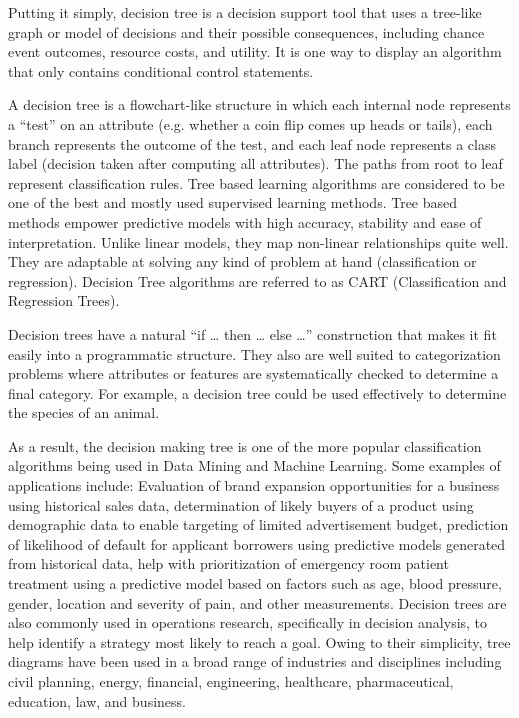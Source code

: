 \documentclass[12pt]{article}
\begin{document}
Putting it simply, decision tree is a decision support tool that uses a tree-like graph or model of decisions and their possible consequences, including chance event outcomes, resource costs, and utility. It is one way to display an algorithm that only contains conditional control statements.

A decision tree is a flowchart-like structure in which each internal node represents a “test” on an attribute (e.g. whether a coin flip comes up heads or tails), each branch represents the outcome of the test, and each leaf node represents a class label (decision taken after computing all attributes). The paths from root to leaf represent classification rules. Tree based learning algorithms are considered to be one of the best and mostly used supervised learning methods. Tree based methods empower predictive models with high accuracy, stability and ease of interpretation. Unlike linear models, they map non-linear relationships quite well. They are adaptable at solving any kind of problem at hand (classification or regression). Decision Tree algorithms are referred to as CART (Classification and Regression Trees).

Decision trees have a natural “if … then … else …” construction that makes it fit easily into a programmatic structure. They also are well suited to categorization problems where attributes or features are systematically checked to determine a final category. For example, a decision tree could be used effectively to determine the species of an animal.

As a result, the decision making tree is one of the more popular classification algorithms being used in Data Mining and Machine Learning. Some examples of applications include: Evaluation of brand expansion opportunities for a business using historical sales data, determination of likely buyers of a product using demographic data to enable targeting of limited advertisement budget, prediction of likelihood of default for applicant borrowers using predictive models generated from historical data, help with prioritization of emergency room patient treatment using a predictive model based on factors such as age, blood pressure, gender, location and severity of pain, and other measurements. Decision trees are also commonly used in operations research, specifically in decision analysis, to help identify a strategy most likely to reach a goal. Owing to their simplicity, tree diagrams have been used in a broad range of industries and disciplines including civil planning, energy, financial, engineering, healthcare, pharmaceutical, education, law, and business.
\end{document}
